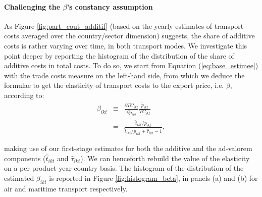 \documentclass[a4paper,11pt]{article}
\begin{document}
\paragraph{Challenging the $\beta$'s constancy assumption} As Figure \ref{fig:part_cout_additif} (based on the yearly estimates of transport costs averaged over the country/sector dimension) suggests, the share of additive costs is rather varying over time, in both transport modes.
We investigate this point deeper by reporting the histogram of the distribution of the share of additive costs in total costs.
To do so, we start from Equation (\ref{eq:base_estimee}) with the trade costs measure on the left-hand side, from which we deduce the formulae to get the elasticity of transport costs to the export price, i.e.
$\beta$, according to:
\begin{eqnarray*}
\beta_{ikt} &\equiv& \frac{\partial TC_{ikt}}{\partial \widetilde{p}_{ikt}}\frac{\widetilde{p}_{ikt}}{TC_{ikt}} \\
&=& \frac{\widehat{t}_{ikt}/\widetilde{p}_{ikt}}{\widehat{t}_{ikt}/\widetilde{p}_{ikt}+\widehat{\tau}_{ikt}-1},
\end{eqnarray*}

\noindent making use of our first-stage estimates for both the additive and the ad-valorem components ($\widehat{t}_{ikt}$ and $\widehat{\tau}_{ikt}$).
We can henceforth rebuild the value of the elasticity on a per product-year-country basis.
The histogram of the distribution of the estimated $\beta_{ikt}$ is reported in Figure \ref{fig:histogram_beta}, in panels (a) and (b) for air and maritime transport respectively.
\end{document}
